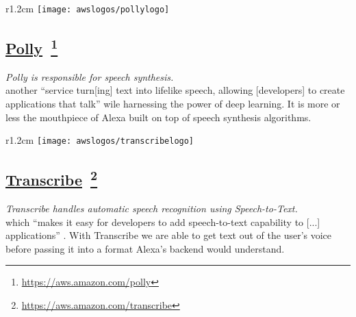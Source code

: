 %	
\begin{wrapfigure}[2]{r}{1.2cm}
		\texttt{[image: awslogos/pollylogo]}
\end{wrapfigure}



\subsection*{
\href{https://aws.amazon.com/polly/}{\textbf{Polly}}~\footnote{\url{https://aws.amazon.com/polly}}
}
\textit{Polly is responsible for speech synthesis.}\\
	another ``service turn[ing] text into lifelike speech, allowing [developers] to create applications that talk'' \cite{aws_website} wile harnessing the power of deep learning. It is more or less the mouthpiece of Alexa built on top of speech synthesis algorithms.
	

	
	\begin{wrapfigure}[2]{r}{1.2cm}
		\texttt{[image: awslogos/transcribelogo]}
	\end{wrapfigure}
	
	
	\subsection*{
		\href{https://aws.amazon.com/transcribe/}{\textbf{Transcribe}}~\footnote{\url{https://aws.amazon.com/transcribe}}
} 
		\textit{Transcribe handles automatic speech recognition using Speech-to-Text.}\\
	which ``makes it easy for developers to add speech-to-text capability to [...] applications'' \cite{aws_website}. With Transcribe we are able to get text out of the user's voice before passing it into a format Alexa's backend would understand.
	
	
	
